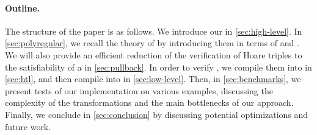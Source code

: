 \paragraph{Outline.} The structure of the paper is as follows. We introduce our
 in \cref{sec:high-level}. In \cref{sec:polyregular},
we recall the theory of  by introducing them in terms
of  and . We will also
provide an efficient reduction of the verification of Hoare triples to the
satisfiability of a  in \cref{sec:pullback}.
In order to verify , we compile them into  in \cref{sec:htl}, and then compile  into
 in \cref{sec:low-level}. 
%
Then, in \cref{sec:benchmarks}, we present
tests of our implementation on various examples, discussing
the complexity of the transformations and the main bottlenecks of our approach.
Finally, we conclude in \cref{sec:conclusion} by discussing potential
optimizations and future work.

